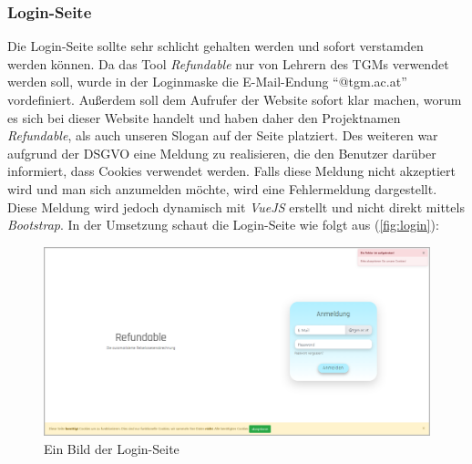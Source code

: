 \subsubsection{Login-Seite}
\label{chapter:implementierung-frontend-komponenten-login}
Die Login-Seite sollte sehr schlicht gehalten werden und sofort verstamden werden können. Da das Tool \textit{Refundable} nur von Lehrern des TGMs verwendet werden soll, wurde in der Loginmaske die E-Mail-Endung \enquote{@tgm.ac.at} vordefiniert. Außerdem soll dem Aufrufer der Website sofort klar machen, worum es sich bei dieser Website handelt und haben daher den Projektnamen \textit{Refundable}, als auch unseren Slogan auf der Seite platziert. Des weiteren war aufgrund der DSGVO eine Meldung zu realisieren, die den Benutzer darüber informiert, dass Cookies verwendet werden. Falls diese Meldung nicht akzeptiert wird und man sich anzumelden möchte, wird eine Fehlermeldung dargestellt. Diese Meldung wird jedoch dynamisch mit \textit{VueJS} erstellt und nicht direkt mittels \textit{Bootstrap}. In der Umsetzung schaut die Login-Seite wie folgt aus (\autoref{fig:login}):
\begin{figure}[H]
	\centering
	\includegraphics[width=1\linewidth]{images/website/login}
	\caption[Login Seite]{Ein Bild der Login-Seite}
	\label{fig:login}
\end{figure}
